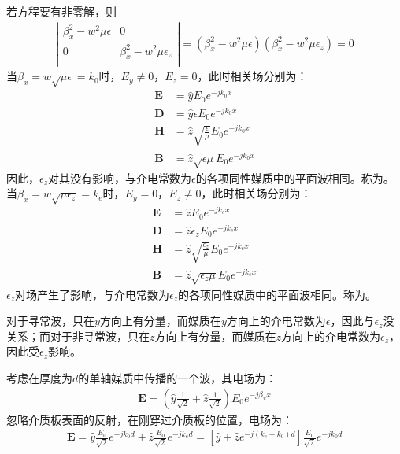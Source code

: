 \documentclass{article}
\numberwithin{equation}{section}
\begin{document}
若方程要有非零解，则
\begin{align}
    \label{eq:eq459}
    \left|
        \begin{matrix}
            \beta_x^2-w^2\mu\epsilon & 0 \\
            0 & \beta_x^2-w^2\mu\epsilon_z \\
        \end{matrix}
    \right|=(\beta_x^2-w^2\mu\epsilon)(\beta_x^2-w^2\mu\epsilon_z)=0
\end{align}
当$\beta_x=w\sqrt{\mu\epsilon}=k_0$时，$E_y\neq0$，$E_z=0$，此时相关场分别为：
\begin{align}
    \label{eq:eq460}
    \mathbf{E}&=\hat{y}E_0e^{-jk_0x} \\
    \label{eq:eq461}
    \mathbf{D}&=\hat{y}\epsilon E_0e^{-jk_0x} \\
    \label{eq:eq462}
    \mathbf{H}&=\hat{z}\sqrt{\frac{\epsilon}{\mu}}E_0e^{-jk_0x} \\
    \label{eq:eq463}
    \mathbf{B}&=\hat{z}\sqrt{\epsilon\mu}E_0e^{-jk_0x}
\end{align}
因此，$\epsilon_z$对其没有影响，与介电常数为$\epsilon$的各项同性媒质中的平面波相同。称为\textbf{\color{blue}{寻常波}}。
当$\beta_x=w\sqrt{\mu\epsilon_z}=k_e$时，$E_y=0$，$E_z\neq0$，此时相关场分别为：
\begin{align}
    \label{eq:eq464}
    \mathbf{E}&=\hat{z}E_0e^{-jk_ex} \\
    \label{eq:eq465}
    \mathbf{D}&=\hat{z}\epsilon_z E_0e^{-jk_ex} \\
    \label{eq:eq466}
    \mathbf{H}&=\hat{z}\sqrt{\frac{\epsilon_z}{\mu}}E_0e^{-jk_ex} \\
    \label{eq:eq467}
    \mathbf{B}&=\hat{z}\sqrt{\epsilon_z\mu}E_0e^{-jk_ex}
\end{align}
$\epsilon_z$对场产生了影响，与介电常数为$\epsilon_z$的各项同性媒质中的平面波相同。称为\textbf{\color{blue}{非寻常波}}。\par
对于寻常波，只在$y$方向上有分量，而媒质在$y$方向上的介电常数为$\epsilon$，因此与$\epsilon_z$没关系；而对于非寻常波，只在$z$方向上有分量，而媒质在$z$方向上的介电常数为$\epsilon_z$，因此受$\epsilon_z$影响。\par
考虑在厚度为$d$的单轴媒质中传播的一个波，其电场为：
\begin{align}
    \label{eq:eq468}
    \mathbf{E}=\left(\hat{y}\frac{1}{\sqrt{2}}+\hat{z}\frac{1}{\sqrt{2}}\right)E_0e^{-j\beta_xx}
\end{align}
忽略介质板表面的反射，在刚穿过介质板的位置，电场为：
\begin{align}
    \label{eq:eq469}
    \mathbf{E}=\hat{y}\frac{E_0}{\sqrt{2}}e^{-jk_0d}+\hat{z}\frac{E_0}{\sqrt{2}}e^{-jk_ed}=[\hat{y}+\hat{z}e^{-j(k_e-k_0)d}]\frac{E_0}{\sqrt{2}}e^{-jk_0d}
\end{align}
\end{document}
